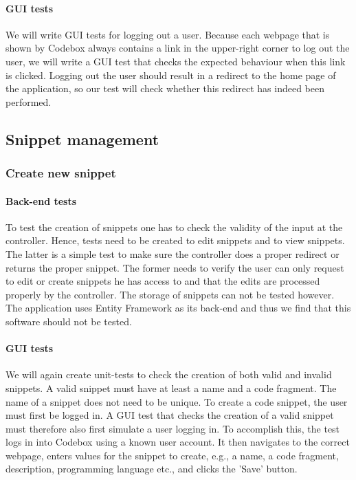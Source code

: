 \documentclass[10pt,a4paper,BCOR12mm, headexclude, footexclude,
  twoside, openright]{scrartcl}
\numberwithin{equation}{section} %
\numberwithin{figure}{section} %
\numberwithin{table}{section} %
\begin{document}
\paragraph{GUI tests}
We will write GUI tests for logging out a user. Because each webpage that is shown by Codebox always contains a link in the upper-right corner to log out the user, we will write a GUI test that checks the expected behaviour when this link is clicked.
Logging out the user should result in a redirect to the home page of the application, so our test will check whether this redirect has indeed been performed.

\subsection{Snippet management}

\subsubsection*{Create new snippet}
\paragraph{Back-end tests}
To test the creation of snippets one has to check the validity of the input at the controller.
Hence, tests need to be created to edit snippets and to view snippets. The latter is a simple test to make sure the controller does a proper redirect or returns the proper snippet.
The former needs to verify the user can only request to edit or create snippets he has access to and that the edits are processed properly by the controller.
The storage of snippets can not be tested however. The application uses Entity Framework as its back-end and thus we find that this software should not be tested.

\paragraph{GUI tests}
We will again create unit-tests to check the creation of both valid and invalid snippets.
A valid snippet must have at least a name and a code fragment. The name of a snippet does not need to be unique.
To create a code snippet, the user must first be logged in.
A GUI test that checks the creation of a valid snippet must therefore also first simulate a user logging in.
To accomplish this, the test logs in into Codebox using a known user account. It then navigates to the correct webpage, enters values for the snippet to create, e.g., a name, a code fragment, description, programming language etc., and clicks the 'Save' button.
\end{document}

